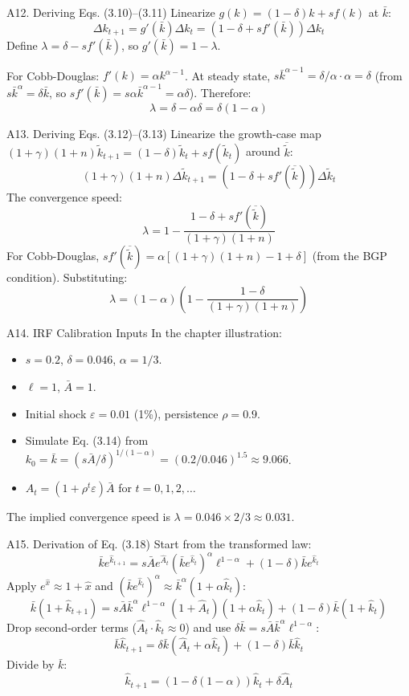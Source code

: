 \documentclass[aspectratio=169,10pt]{beamer}
\newcommand{\backbutton}[1]{\hfill\hyperlink{#1}{\beamerbutton{Back}}}
\begin{document}
\begin{frame}{A12. Deriving Eqs. (3.10)--(3.11)}
\hypertarget{a12}{}
Linearize $g(k)=(1-\delta)k+sf(k)$ at $\bar{k}$:
\[
\Delta k_{t+1}=g'(\bar{k})\Delta k_t=(1-\delta+s f'(\bar{k}))\Delta k_t
\]
Define $\lambda=\delta-s f'(\bar{k})$, so $g'(\bar{k}) = 1-\lambda$.

\medskip
For Cobb-Douglas: $f'(k)=\alpha k^{\alpha-1}$. At steady state, $s\bar{k}^{\alpha-1} = \delta/\alpha \cdot \alpha = \delta$ (from $s\bar{k}^{\alpha}=\delta\bar{k}$, so $sf'(\bar{k})=s\alpha\bar{k}^{\alpha-1}=\alpha\delta$). Therefore:
\[
\lambda=\delta-\alpha\delta=\delta(1-\alpha)
\]
\backbutton{m-a12}
\end{frame}

\begin{frame}{A13. Deriving Eqs. (3.12)--(3.13)}
\hypertarget{a13}{}
Linearize the growth-case map $(1+\gamma)(1+n)\tilde{k}_{t+1}=(1-\delta)\tilde{k}_t+sf(\tilde{k}_t)$ around $\overline{\tilde{k}}$:
\[
(1+\gamma)(1+n)\Delta\tilde{k}_{t+1}=(1-\delta+s f'(\overline{\tilde{k}}))\Delta\tilde{k}_t
\]
The convergence speed:
\[
\lambda=1-\frac{1-\delta+s f'(\overline{\tilde{k}})}{(1+\gamma)(1+n)}
\]
For Cobb-Douglas, $sf'(\overline{\tilde{k}}) = \alpha[(1+\gamma)(1+n)-1+\delta]$ (from the BGP condition). Substituting:
\[
\lambda=(1-\alpha)\left(1-\frac{1-\delta}{(1+\gamma)(1+n)}\right)
\]
\backbutton{m-a13}
\end{frame}

\begin{frame}{A14. IRF Calibration Inputs}
\hypertarget{a14}{}
In the chapter illustration:
\begin{itemize}
  \item $s=0.2$, $\delta=0.046$, $\alpha=1/3$.
  \item $\ell=1$, $\bar{A}=1$.
  \item Initial shock $\varepsilon=0.01$ (1\%), persistence $\rho=0.9$.
  \item Simulate Eq. (3.14) from $k_0=\bar{k}=(s\bar{A}/\delta)^{1/(1-\alpha)} = (0.2/0.046)^{1.5} \approx 9.066$.
  \item $A_t = (1+\rho^t\varepsilon)\bar{A}$ for $t=0,1,2,\ldots$
\end{itemize}
The implied convergence speed is $\lambda = 0.046 \times 2/3 \approx 0.031$.
\backbutton{m-a14}
\end{frame}

\begin{frame}{A15. Derivation of Eq. (3.18)}
\hypertarget{a15}{}
Start from the transformed law:
\[
\bar{k}e^{\hat{k}_{t+1}}=s\bar{A}e^{\hat{A}_t}(\bar{k}e^{\hat{k}_t})^{\alpha}\ell^{1-\alpha}+(1-\delta)\bar{k}e^{\hat{k}_t}
\]
Apply $e^{\hat{x}}\approx 1+\hat{x}$ and $(\bar{k}e^{\hat{k}_t})^{\alpha}\approx \bar{k}^{\alpha}(1+\alpha\hat{k}_t)$:
\[
\bar{k}(1+\hat{k}_{t+1})=s\bar{A}\bar{k}^{\alpha}\ell^{1-\alpha}(1+\hat{A}_t)(1+\alpha\hat{k}_t)+(1-\delta)\bar{k}(1+\hat{k}_t)
\]
Drop second-order terms ($\hat{A}_t\cdot\hat{k}_t\approx 0$) and use $\delta\bar{k}=s\bar{A}\bar{k}^{\alpha}\ell^{1-\alpha}$:
\[
\bar{k}\hat{k}_{t+1}=\delta\bar{k}(\hat{A}_t+\alpha\hat{k}_t)+(1-\delta)\bar{k}\hat{k}_t
\]
Divide by $\bar{k}$:
\[
\hat{k}_{t+1}=(1-\delta(1-\alpha))\hat{k}_t+\delta\hat{A}_t
\]
\backbutton{m-a15}
\end{frame}
\end{document}
